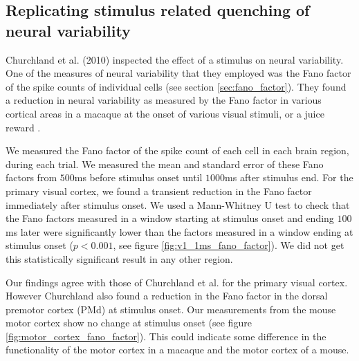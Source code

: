   \subsection{Replicating stimulus related quenching of neural variability}
  Churchland et al. (2010) inspected the effect of a stimulus on neural variability. One of the measures of neural variability that they employed was the Fano factor of the spike counts of individual cells (see section \ref{sec:fano_factor}). They found a reduction in neural variability as measured by the Fano factor in various cortical areas in a macaque at the onset of various visual stimuli, or a juice reward \parencite{Churchland}.

  We measured the Fano factor of the spike count of each cell in each brain region, during each trial. We measured the mean and standard error of these Fano factors from $500$ms before stimulus onset until $1000$ms after stimulus end. For the primary visual cortex, we found a transient reduction in the Fano factor immediately after stimulus onset. We used a Mann-Whitney U test to check that the Fano factors measured in a window starting at stimulus onset and ending $100$ms later were significantly lower than the factors measured in a window ending at stimulus onset ($p < 0.001$, see figure \ref{fig:v1_1ms_fano_factor}). We did not get this statistically significant result in any other region.

  Our findings agree with those of Churchland et al. for the primary visual cortex. However Churchland also found a reduction in the Fano factor in the dorsal premotor cortex (PMd) at stimulus onset. Our measurements from the mouse motor cortex show no change at stimulus onset (see figure \ref{fig:motor_cortex_fano_factor}). This could indicate some difference in the functionality of the motor cortex in a macaque and the motor cortex of a mouse.

